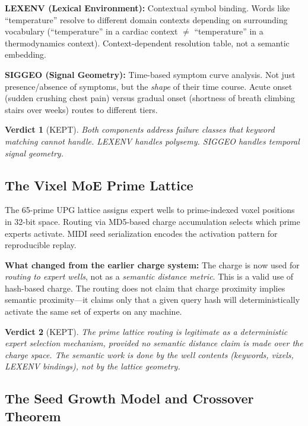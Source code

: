 \documentclass[11pt]{article}
\newtheorem{verdict}{Verdict}
\begin{document}
\textbf{LEXENV (Lexical Environment):} Contextual symbol binding. Words like ``temperature'' resolve to different domain contexts depending on surrounding vocabulary (``temperature'' in a cardiac context $\neq$ ``temperature'' in a thermodynamics context). Context-dependent resolution table, not a semantic embedding.

\textbf{SIGGEO (Signal Geometry):} Time-based symptom curve analysis. Not just presence/absence of symptoms, but the \textit{shape} of their time course. Acute onset (sudden crushing chest pain) versus gradual onset (shortness of breath climbing stairs over weeks) routes to different tiers.

\begin{verdict}[\textcolor{keepgreen}{KEPT}]
Both components address failure classes that keyword matching cannot handle. LEXENV handles polysemy. SIGGEO handles temporal signal geometry.
\end{verdict}

\subsection{The Vixel MoE Prime Lattice}

The 65-prime UPG lattice assigns expert wells to prime-indexed voxel positions in 32-bit space. Routing via MD5-based charge accumulation selects which prime experts activate. MIDI seed serialization encodes the activation pattern for reproducible replay.

\begin{graybox}
\textbf{What changed from the earlier charge system:} The charge is now used for \textit{routing to expert wells}, not as a \textit{semantic distance metric}. This is a valid use of hash-based charge. The routing does not claim that charge proximity implies semantic proximity---it claims only that a given query hash will deterministically activate the same set of experts on any machine.
\end{graybox}

\begin{verdict}[\textcolor{keepgreen}{KEPT}]
The prime lattice routing is legitimate as a deterministic expert selection mechanism, provided no semantic distance claim is made over the charge space. The semantic work is done by the well contents (keywords, vixels, LEXENV bindings), not by the lattice geometry.
\end{verdict}

\subsection{The Seed Growth Model and Crossover Theorem}
\end{document}
